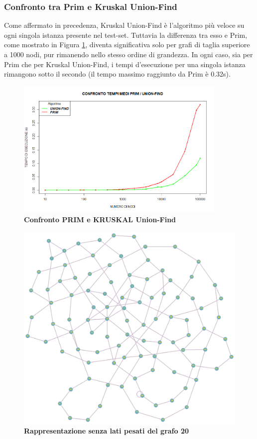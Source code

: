 \documentclass[]{article}
\begin{document}
\begin{flushleft}
\subsubsection{Confronto tra Prim e Kruskal Union-Find}
Come affermato in precedenza, Kruskal Union-Find è l'algoritmo più veloce su ogni singola istanza presente nel test-set. Tuttavia la differenza tra esso e Prim, come mostrato in Figura \ref{prim-uf}, diventa significativa solo per grafi di taglia superiore a 1000 nodi, pur rimanendo nello stesso ordine di grandezza. In ogni caso, sia per Prim che per Kruskal Union-Find, i tempi d'esecuzione per una singola istanza rimangono sotto il secondo (il tempo massimo raggiunto da Prim è 0.32s).
\begin{figure}[h]
\centering
\includegraphics[width=0.9\textwidth,height=\textheight,keepaspectratio]{COMPARE_1.png}
\caption{\textbf{Confronto PRIM e KRUSKAL Union-Find}}
\label{prim-uf}
\end{figure}

\begin{figure}[h]
	\centering
	\includegraphics[width=\textwidth,height=\textheight,keepaspectratio]{grafo_20.png}\caption{\textbf{Rappresentazione senza lati pesati del grafo 20}}
	\label{grap_20}
\end{figure}
\end{flushleft}
\end{document}
